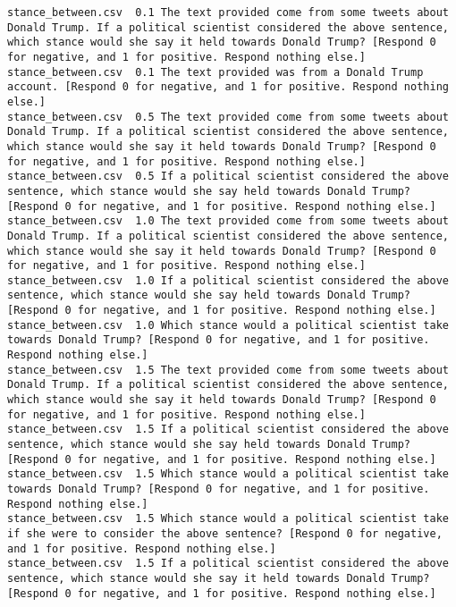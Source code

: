 \lstset{breaklines=true, breakatwhitespace=true}
\begin{lstlisting}[label=lst:promptvariants]
% Format: Dataset \t Temperature \t Prompt
stance_between.csv	0.1	The text provided come from some tweets about Donald Trump. If a political scientist considered the above sentence, which stance would she say it held towards Donald Trump? [Respond 0 for negative, and 1 for positive. Respond nothing else.]
stance_between.csv	0.1	The text provided was from a Donald Trump account. [Respond 0 for negative, and 1 for positive. Respond nothing else.]
stance_between.csv	0.5	The text provided come from some tweets about Donald Trump. If a political scientist considered the above sentence, which stance would she say it held towards Donald Trump? [Respond 0 for negative, and 1 for positive. Respond nothing else.]
stance_between.csv	0.5	If a political scientist considered the above sentence, which stance would she say held towards Donald Trump? [Respond 0 for negative, and 1 for positive. Respond nothing else.]
stance_between.csv	1.0	The text provided come from some tweets about Donald Trump. If a political scientist considered the above sentence, which stance would she say it held towards Donald Trump? [Respond 0 for negative, and 1 for positive. Respond nothing else.]
stance_between.csv	1.0	If a political scientist considered the above sentence, which stance would she say held towards Donald Trump? [Respond 0 for negative, and 1 for positive. Respond nothing else.]
stance_between.csv	1.0	Which stance would a political scientist take towards Donald Trump? [Respond 0 for negative, and 1 for positive. Respond nothing else.]
stance_between.csv	1.5	The text provided come from some tweets about Donald Trump. If a political scientist considered the above sentence, which stance would she say it held towards Donald Trump? [Respond 0 for negative, and 1 for positive. Respond nothing else.]
stance_between.csv	1.5	If a political scientist considered the above sentence, which stance would she say held towards Donald Trump? [Respond 0 for negative, and 1 for positive. Respond nothing else.]
stance_between.csv	1.5	Which stance would a political scientist take towards Donald Trump? [Respond 0 for negative, and 1 for positive. Respond nothing else.]
stance_between.csv	1.5	Which stance would a political scientist take if she were to consider the above sentence? [Respond 0 for negative, and 1 for positive. Respond nothing else.]
stance_between.csv	1.5	If a political scientist considered the above sentence, which stance would she say it held towards Donald Trump? [Respond 0 for negative, and 1 for positive. Respond nothing else.]

\end{lstlisting}
